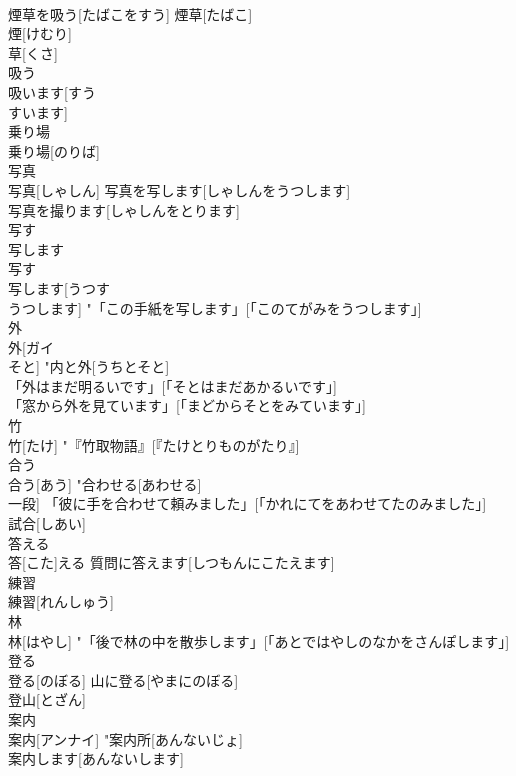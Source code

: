 \documentclass[8pt]{extreport}
\begin{document}
\begin{CJK}{UTF8}{min}
\\	煙草を吸う[たばこをすう]	煙草[たばこ] 
\\	煙[けむり] 
\\	草[くさ] 
\\	吸う 
\\	吸います[すう 
\\	すいます] 
\\	乗り場	
\\	乗り場[のりば]	
\\	写真	
\\	写真[しゃしん]	写真を写します[しゃしんをうつします] 
\\	写真を撮ります[しゃしんをとります] 
\\	写す 
\\	写します	
\\	写す 
\\	写します[うつす 
\\	うつします]	"「この手紙を写します」[「このてがみをうつします」] 
\\	外	
\\	外[ガイ 
\\	そと]	"内と外[うちとそと] 
\\	「外はまだ明るいです」[「そとはまだあかるいです」] 
\\	「窓から外を見ています」[「まどからそとをみています」] 
\\	竹	
\\	竹[たけ]	"『竹取物語』[『たけとりものがたり』] 
\\	合う	
\\	合う[あう]	"合わせる[あわせる] 
\\	一段] 「彼に手を合わせて頼みました」[「かれにてをあわせてたのみました」] 
\\	試合[しあい] 
\\	答える	
\\	答[こた]える	質問に答えます[しつもんにこたえます] 
\\	練習	
\\	練習[れんしゅう]	
\\	林	
\\	林[はやし]	"「後で林の中を散歩します」[「あとではやしのなかをさんぽします」] 
\\	登る	
\\	登る[のぼる]	山に登る[やまにのぼる] 
\\	登山[とざん] 
\\	案内	
\\	案内[アンナイ]	"案内所[あんないじょ] 
\\	案内します[あんないします] 

\end{CJK}
\end{document}
